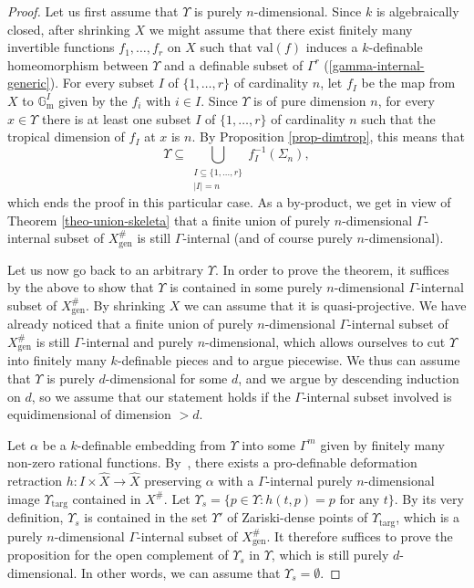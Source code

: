 \documentclass[JEP,XML,SOM,Unicode,ThmDefs,NoEqCountersInSection,published]{cedram}
\newcommand{\val}{\mathrm{val}}
\newcommand{\gm}{\bG_{\mathrm m}}
\newcommand{\bG}{\mathbb G}
\theoremstyle{plain}
\theoremstyle{definition}
\begin{document}
\begin{proof}
Let us first assume that $\Upsilon$ is purely $n$\nobreakdash-dimen\-sional.
Since $k$ is algebraically closed, after shrinking $X$ we might assume that there exist
finitely many invertible functions $f_1,\ldots, f_r$ on $X$ such that $\val (f)$ induces a $k$-definable
homeomorphism between $\Upsilon$ and a definable subset of $\Gamma^r$
(\ref{gamma-internal-generic}). For every
subset $I$ of $\{1,\ldots, r\}$
of cardinality $n$, let $f_I$ be the map from $X$ to $\gm^I$ given by the $f_i$ with $i\in I$. Since $\Upsilon$
is of pure dimension $n$, for every $x\in \Upsilon$ there is at least one subset $I$ of $\{1,\ldots, r\}$
of cardinality $n$ such that the tropical dimension of $f_I$ at $x$ is $n$. By Proposition \ref{prop-dimtrop},
this means that \[\Upsilon \subseteq\bigcup_{\substack{I\subseteq\{1,\ldots, r\}\\ |I|=n}}
f_I^{-1}(\Sigma_n),\]
which ends the proof in this particular case. As a by-product, we get in view of
Theorem
\ref{theo-union-skeleta} that a finite union of purely $n$\nobreakdash-dimen\-sional $\Gamma$-internal subset
of $X^\#_{\mathrm{gen}}$ is still $\Gamma$-internal (and of course purely $n$\nobreakdash-dimen\-sional).

Let us now go back to an arbitrary $\Upsilon$. In order to prove the theorem,
it suffices by the above to show that $\Upsilon$ is contained in some
purely $n$\nobreakdash-dimen\-sional $\Gamma$-internal subset
of $X^\#_{\mathrm{gen}}$.
By shrinking $X$ we can assume
that it is quasi-projective. We have already noticed
that a
finite union of purely $n$\nobreakdash-dimen\-sional $\Gamma$-internal subset
of $X^\#_{\mathrm{gen}}$ is still $\Gamma$-internal and purely $n$\nobreakdash-dimen\-sional,
which allows ourselves to cut $\Upsilon$ into finitely many $k$-definable pieces and to argue piecewise.
We thus can assume that $\Upsilon$ is purely $d$-dimensional for some $d$, and we argue by descending induction on $d$, so
we assume
that our statement holds if the $\Gamma$-internal subset
involved is equidimensional of dimension
$>d$.

Let $\alpha$ be
a $k$-definable embedding from $\Upsilon$ into some $\Gamma^m$ given by finitely many non-zero rational functions.
By~\cite[Th.\,11.1.1]{HL}, there exists a pro-definable deformation retraction $h:I\times \widehat{X}\to\widehat{X}$ preserving $\alpha$ with a
$\Gamma$-internal purely $n$\nobreakdash-dimen\-sional image $\Upsilon_{\mathrm{targ}}$ contained in $X^\#.$
Let $\Upsilon_s =\{p\in \Upsilon: h(t,p)=p \text{ for any } t\}$. By its very definition, $\Upsilon_s$ is contained in the set
$\Upsilon'$ of Zariski-dense
points of $\Upsilon_{\mathrm{targ}}$, which is a purely $n$\nobreakdash-dimen\-sional $\Gamma$-internal subset of $X^{\#}_{\mathrm{gen}}$. It
therefore suffices to prove the proposition for the open complement of $\Upsilon_s$
in $\Upsilon$, which is still purely $d$-dimensional.
In other words, we can assume that $\Upsilon_s=\emptyset$.


\end{proof}
\end{document}
